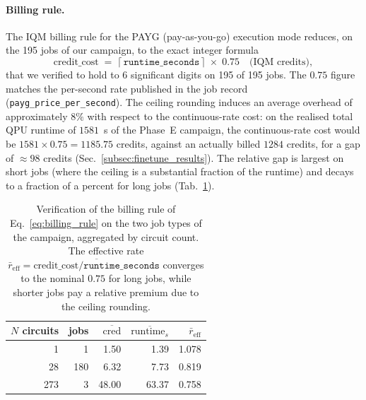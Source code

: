 \paragraph{Billing rule.}
The IQM billing rule for the PAYG (pay-as-you-go) execution mode reduces, on the 195 jobs of our campaign, to the exact integer formula
\begin{equation}
\text{credit\_cost} \;=\; \lceil\,\texttt{runtime\_seconds}\,\rceil \;\times\; 0.75 \quad\text{(IQM credits)},
\label{eq:billing_rule}
\end{equation}
that we verified to hold to 6 significant digits on 195 of 195 jobs. The $0.75$ figure matches the per-second rate published in the job record (\texttt{payg\_price\_per\_second}). The ceiling rounding induces an average overhead of approximately $8\%$ with respect to the continuous-rate cost: on the realised total QPU runtime of $1581$~s of the Phase~E campaign, the continuous-rate cost would be $1581 \times 0.75 = 1185.75$ credits, against an actually billed $1284$ credits, for a gap of $\approx 98$ credits (Sec.~\ref{subsec:finetune_results}). The relative gap is largest on short jobs (where the ceiling is a substantial fraction of the runtime) and decays to a fraction of a percent for long jobs (Tab.~\ref{tab:billing_rule_check}).

\begin{table}[h]
\centering
\caption{Verification of the billing rule of Eq.~\ref{eq:billing_rule} on the two job types of the campaign, aggregated by circuit count. The effective rate $\bar r_{\mathrm{eff}}=\overline{\text{credit\_cost} / \texttt{runtime\_seconds}}$ converges to the nominal $0.75$ for long jobs, while shorter jobs pay a relative premium due to the ceiling rounding.}
\label{tab:billing_rule_check}
\begin{tabular}{rrrrr}
\toprule
$N$ circuits & jobs & $\overline{\text{cred}}$ & $\overline{\text{runtime}_s}$ & $\bar r_{\mathrm{eff}}$ \\
\midrule
\phantom{00}1 & \phantom{00}1 & \phantom{0}1.50 & \phantom{0}1.39 & 1.078 \\
\phantom{0}28 & 180 & \phantom{0}6.32 & \phantom{0}7.73 & 0.819 \\
273           & \phantom{00}3 & 48.00 & 63.37 & 0.758 \\
\bottomrule
\end{tabular}
\end{table}

